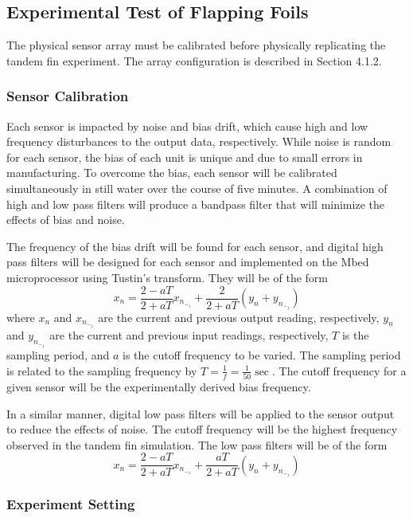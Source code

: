 
\subsection{Experimental Test of Flapping Foils}

    The physical sensor array must be calibrated before physically replicating the tandem fin experiment. The array configuration is described in Section 4.1.2.
    
\subsubsection{Sensor Calibration} \label{Sensor Calibration}

    Each sensor is impacted by noise and bias drift, which cause high and low frequency disturbances to the output data, respectively. While noise is random for each sensor, the bias of each unit is unique and due to small errors in manufacturing. To overcome the bias, each sensor will be calibrated simultaneously in still water over the course of five minutes. A combination of high and low pass filters will produce a bandpass filter that will minimize the effects of bias and noise.
    
    The frequency of the bias drift will be found for each sensor, and digital high pass filters will be designed for each sensor and implemented on the Mbed microprocessor using Tustin's transform. They will be of the form \[x_n=\frac{2-aT}{2+aT}x_n_-_1+\frac{2}{2+aT}(y_n+y_n_-_1)\] where \(x_n\) and \(x_n_-_1\) are the current and previous output reading, respectively, \(y_n\) and \(y_n_-_1\) are the current and previous input readings, respectively, \(T\) is the sampling period, and \(a\) is the cutoff frequency to be varied. The sampling period is related to the sampling frequency by \(T=\frac{1}{f}=\frac{1}{50}\sec\). The cutoff frequency for a given sensor will be the experimentally derived bias frequency.
    
    In a similar manner, digital low pass filters will be applied to the sensor output to reduce the effects of noise. The cutoff frequency will be the highest frequency observed in the tandem fin simulation. The low pass filters will be of the form \[x_n=\frac{2-aT}{2+aT}x_n_-_1+\frac{aT}{2+aT}(y_n+y_n_-_1)\]

\subsubsection{Experiment Setting} \label{Experiment Setting}

